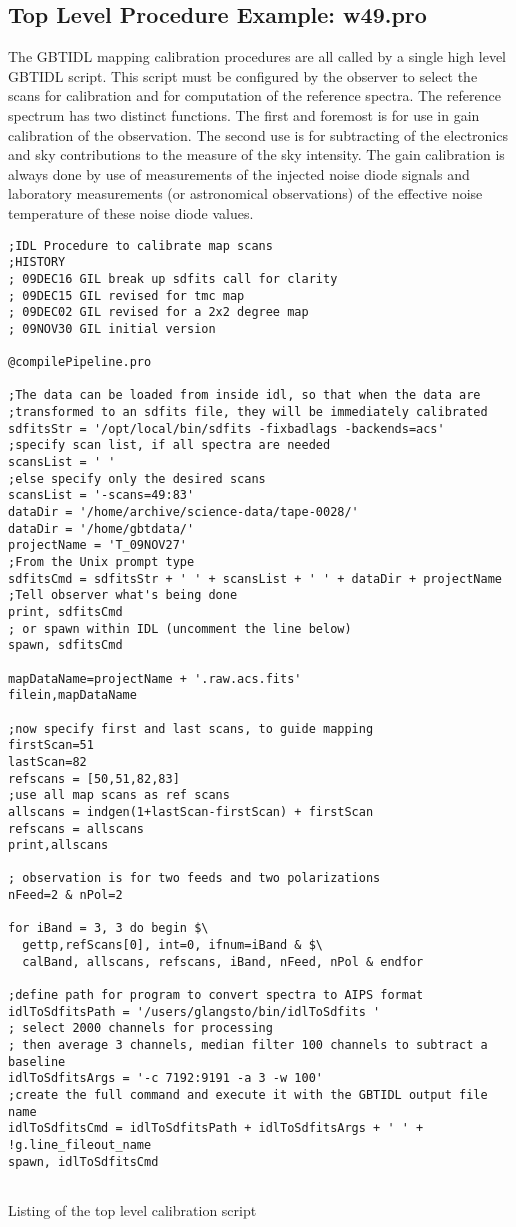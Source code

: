 \documentclass[12pt,twoside]{article}
\begin{document}
\subsection{Top Level Procedure Example: w49.pro}
The GBTIDL mapping calibration procedures are all called by a single high
level GBTIDL script.  This script must be configured by the observer to
select the scans for calibration and for computation of the reference
spectra.   The reference spectrum has two distinct functions.  The first
and foremost is for use in gain calibration of the observation.  The second use
is for subtracting  of the electronics and sky contributions to the measure of
the sky intensity.   The gain calibration is always done by use of measurements of
the injected noise diode signals and laboratory measurements (or astronomical observations)
of the effective noise temperature of these noise diode values.


\begin{verbatim}
;IDL Procedure to calibrate map scans
;HISTORY
; 09DEC16 GIL break up sdfits call for clarity
; 09DEC15 GIL revised for tmc map
; 09DEC02 GIL revised for a 2x2 degree map
; 09NOV30 GIL initial version

@compilePipeline.pro

;The data can be loaded from inside idl, so that when the data are
;transformed to an sdfits file, they will be immediately calibrated
sdfitsStr = '/opt/local/bin/sdfits -fixbadlags -backends=acs'
;specify scan list, if all spectra are needed
scansList = ' '
;else specify only the desired scans
scansList = '-scans=49:83'
dataDir = '/home/archive/science-data/tape-0028/'
dataDir = '/home/gbtdata/'
projectName = 'T_09NOV27'
;From the Unix prompt type
sdfitsCmd = sdfitsStr + ' ' + scansList + ' ' + dataDir + projectName
;Tell observer what's being done
print, sdfitsCmd
; or spawn within IDL (uncomment the line below)
spawn, sdfitsCmd

mapDataName=projectName + '.raw.acs.fits'
filein,mapDataName

;now specify first and last scans, to guide mapping
firstScan=51
lastScan=82
refscans = [50,51,82,83]
;use all map scans as ref scans
allscans = indgen(1+lastScan-firstScan) + firstScan
refscans = allscans
print,allscans

; observation is for two feeds and two polarizations
nFeed=2 & nPol=2

for iBand = 3, 3 do begin $\
  gettp,refScans[0], int=0, ifnum=iBand & $\
  calBand, allscans, refscans, iBand, nFeed, nPol & endfor 
  
;define path for program to convert spectra to AIPS format
idlToSdfitsPath = '/users/glangsto/bin/idlToSdfits '
; select 2000 channels for processing
; then average 3 channels, median filter 100 channels to subtract a baseline
idlToSdfitsArgs = '-c 7192:9191 -a 3 -w 100'
;create the full command and execute it with the GBTIDL output file name
idlToSdfitsCmd = idlToSdfitsPath + idlToSdfitsArgs + ' ' + !g.line_fileout_name
spawn, idlToSdfitsCmd
  
\end{verbatim}
\centerline{Listing of the top level calibration script}
\end{document}
